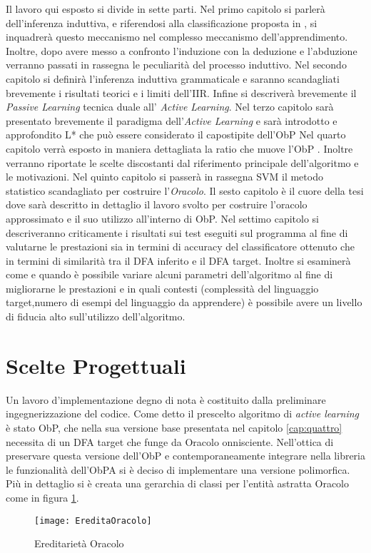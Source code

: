 Il lavoro qui esposto si divide in sette parti. Nel primo capitolo si parlerà dell'inferenza induttiva, e riferendosi alla classificazione proposta in \cite{Mic86a}, si inquadrerà questo meccanismo nel complesso meccanismo dell'apprendimento.
Inoltre, dopo avere messo a confronto l'induzione con la deduzione e l'abduzione verranno passati in rassegna le peculiarità del processo induttivo.
Nel secondo capitolo si definirà l'inferenza induttiva grammaticale e saranno scandagliati brevemente i risultati teorici e i limiti dell'\ac{IIR}. Infine si descriverà brevemente il \textit{Passive Learning} tecnica duale all' \textit{Active Learning}.
Nel terzo capitolo sarà presentato brevemente il paradigma dell'\textit{Active Learning} e sarà introdotto e approfondito L* \cite{Angluin87} che può essere considerato il capostipite dell'\ac{ObP}
Nel quarto capitolo verrà esposto in maniera dettagliata la ratio che muove l'\ac{ObP} . Inoltre verranno riportate le scelte discostanti dal riferimento principale dell'algoritmo \cite{Howar12} e le motivazioni.
Nel quinto capitolo si passerà in rassegna \ac{SVM} il metodo statistico scandagliato per costruire l'\textit{Oracolo}.
Il sesto capitolo è il cuore della tesi dove sarà descritto in dettaglio il lavoro  svolto per costruire l'oracolo approssimato e il suo utilizzo all'interno di \ac{ObP}.
Nel settimo capitolo si descriveranno criticamente i risultati sui test eseguiti sul programma al fine di valutarne le prestazioni sia in termini di accuracy del classificatore ottenuto che in termini di similarità tra il \ac{DFA} inferito e il \ac{DFA} target. Inoltre si esaminerà come e quando è possibile variare alcuni parametri dell'algoritmo al fine di migliorarne le prestazioni e in quali contesti (complessità del linguaggio target,numero di esempi del linguaggio da apprendere) è possibile avere un livello di fiducia alto sull'utilizzo dell'algoritmo. 

\section{Scelte Progettuali}
Un lavoro d'implementazione degno di nota è costituito dalla preliminare ingegnerizzazione del codice. Come detto il prescelto algoritmo di \textit{active learning} è stato \ac{ObP}, che nella sua versione base presentata nel capitolo \ref{cap:quattro} necessita di un \ac{DFA} target che funge da Oracolo onnisciente. Nell'ottica di preservare questa versione dell'\ac{ObP} e contemporaneamente integrare nella libreria le funzionalità dell'\ac{ObPA} si è deciso di implementare una versione polimorfica. Più in dettaglio si è creata una gerarchia di classi per l'entità astratta Oracolo come in figura \ref{fig:eor}.
\begin{figure}[htp]
	\centering
	\texttt{[image: EreditaOracolo]}
	\caption[Ereditarietà Oracolo]{Ereditarietà Oracolo}
   \label{fig:eor}
\end{figure}


